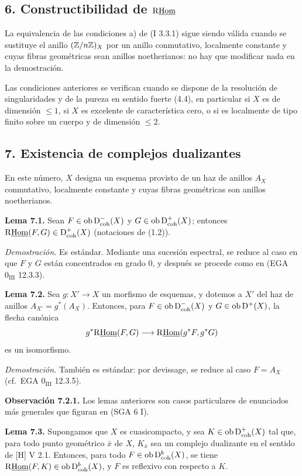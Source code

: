 \subsection*{6. Constructibilidad de $\mathrm{R}\underline{\operatorname{Hom}}$}

La equivalencia de las condiciones a) de (I 3.3.1) sigue siendo válida cuando se sustituye el anillo $(\mathbb{Z}/n\mathbb{Z})_X$ por un anillo conmutativo, localmente constante y cuyas fibras geométricas sean anillos noetherianos: no hay que modificar nada en la demostración.

Las condiciones anteriores se verifican cuando se dispone de la resolución de singularidades y de la pureza en sentido fuerte (4.4), en particular si $X$ es de dimensión $\leq1$, si $X$ es excelente de característica cero, o si es localmente de tipo finito sobre un cuerpo y de dimensión $\leq2$.

\subsection*{7. Existencia de complejos dualizantes}

En este número, $X$ designa un esquema provisto de un haz de anillos $A_X$ conmutativo, localmente constante y cuyas fibras geométricas son anillos noetherianos.

\textbf{Lema 7.1.} Sean $F\in\operatorname{ob}\mathrm{D}^{-}_{\mathrm{coh}}(X)$ y $G\in\operatorname{ob}\mathrm{D}^{+}_{\mathrm{coh}}(X)$; entonces $\mathrm{R}\underline{\operatorname{Hom}}(F,G)\in\mathrm{D}^{+}_{\mathrm{coh}}(X)$ (notaciones de (1.2)).

\emph{Demostración.} Es estándar. Mediante una sucesión espectral, se reduce al caso en que $F$ y $G$ están concentrados en grado $0$, y después se procede como en (EGA $0_{\mathrm{III}}$ 12.3.3).

\textbf{Lema 7.2.} Sea $g:X'\to X$ un morfismo de esquemas, y dotemos a $X'$ del haz de anillos $A_{X'}=g^*(A_X)$. Entonces, para $F\in\operatorname{ob}\mathrm{D}^{-}_{\mathrm{coh}}(X)$ y $G\in\operatorname{ob}\mathrm{D}^{+}(X)$, la flecha canónica
\[
        g^*\mathrm{R}\underline{\operatorname{Hom}}(F,G)\longrightarrow \mathrm{R}\underline{\operatorname{Hom}}(g^*F,g^*G)
\]
es un isomorfismo.

\emph{Demostración.} También es estándar: por devissage, se reduce al caso $F=A_X$ (cf.~EGA $0_{\mathrm{III}}$ 12.3.5).

\textbf{Observación 7.2.1.} Los lemas anteriores son casos particulares de enunciados más generales que figuran en (SGA 6 I).

\textbf{Lema 7.3.} Supongamos que $X$ es cuasicompacto, y sea $K\in\operatorname{ob}\mathrm{D}^{+}_{\mathrm{coh}}(X)$ tal que, para todo punto geométrico $\bar{x}$ de $X$, $K_{\bar{x}}$ sea un complejo dualizante en el sentido de [H] V 2.1. Entonces, para todo $F\in\operatorname{ob}\mathrm{D}^{b}_{\mathrm{coh}}(X)$, se tiene $\mathrm{R}\underline{\operatorname{Hom}}(F,K)\in\operatorname{ob}\mathrm{D}^{b}_{\mathrm{coh}}(X)$, y $F$ es reflexivo con respecto a $K$.

